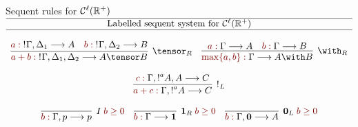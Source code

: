 \documentclass[9pt]{beamer}
\newcommand{\emphdr}[1]{{\color{darkred} #1}}
\begin{document}
\begin{frame}{Sequent rules for $\mathcal{C}^\ell(\mathbb{R}^+)$}
$
\begin{array}{c}
\hline\mbox{Labelled sequent system for }\laIMALLR\\\hline\\
\infer[\tensor_R]{\emphdr{a+b:}\;\nbang{}\Gamma,\Delta_1, \Delta_2 \lra A\tensor B}
{\emphdr{a:}\;\nbang{}\Gamma,\Delta_1 \lra A & \emphdr{b:}\;\nbang{}\Gamma,\Delta_2 \lra B}
\quad
\infer[\with_R]{\emphdr{\max\{a,b\}:}\;\Gamma \lra A \with B}
{\emphdr{a:}\;\Gamma \lra A & \emphdr{b:}\;\Gamma \lra B}
\\\\
\infer[\nbang{}_L]{\emphdr{a+c:}\;\Gamma,\nbang{a}A\lra C}{\emphdr{c:}\;\Gamma,\nbang{a}A,A\lra C}
\\\\
  \infer[I\;\emphdr{b\geq 0}]{\emphdr{b:}\;\Gamma,p \lra p}{} 
 \quad
\infer[\one_R\;\emphdr{b\geq 0}]{\emphdr{b:}\;\Gamma \lra \one}{}
\quad 
\infer[\zero_L\;\emphdr{b\geq 0}]{\emphdr{b:}\; \Gamma,\zero\lra A}{}
\end{array}
$
\end{frame}
\end{document}

